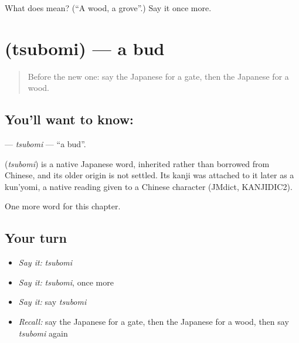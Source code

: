 \begin{tcolorbox}[breakable,colback=teal!4,colframe=teal!35!black,title={Before you move on}]
What does  mean? (\textquotedblleft{}A wood, a grove\textquotedblright{}.) Say it once more.
\end{tcolorbox}
\section[\texorpdfstring{\ja{つぼみ} (tsubomi)}{つぼみ (tsubomi)}]{ (tsubomi) — a bud}

\label{lesson:JA-C106-tsubomi}



\begin{quote}
Before the new one: say the Japanese for a gate, then the Japanese for a wood.
\end{quote}

\subsection*{You'll want to know: }
\textbf{} — \emph{tsubomi} — \textquotedblleft{}a bud\textquotedblright{}.

\begin{cousinweb}
\textbf{} (\emph{tsubomi}) is a native Japanese word, inherited rather than borrowed from Chinese, and its older origin is not settled. Its kanji was attached to it later as a kun'yomi, a native reading given to a Chinese character (JMdict, KANJIDIC2).
\end{cousinweb}

\begin{grammarlens}[title={What you've built}]
One more word for this chapter.
\end{grammarlens}

\subsection*{Your turn}
\begin{itemize}
\raggedright
  \item \emph{Say it:} \emph{tsubomi}
  \item \emph{Say it:} \emph{tsubomi}, once more
  \item \emph{Say it:} say \emph{tsubomi}
  \item \emph{Recall:} say the Japanese for a gate, then the Japanese for a wood, then say \emph{tsubomi} again
\end{itemize}

